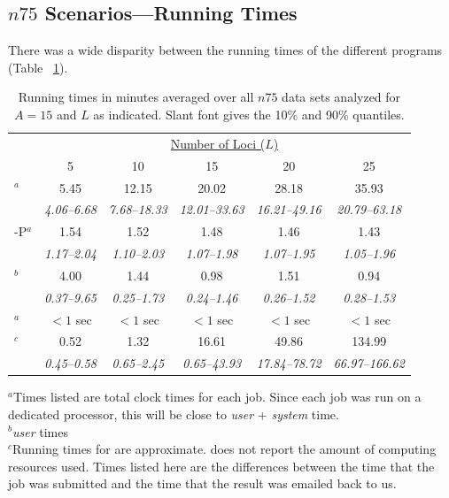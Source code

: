 \subsection*{$n75$ Scenarios---Running Times}
There was a wide disparity between the running times of the different programs (Table~
\ref{tab:n75times}). 
\begin{table}
\caption{Running times in minutes averaged over all $n75$ data sets analyzed for $A=15$ and 
$L$ as indicated. Slant font gives the 10\% and 90\% quantiles.\label{tab:n75times}}
\begin{center}
\begin{tabular}{lccccc}
\hline
  & \multicolumn{5}{c}{\underline{Number of Loci ($L$)}} \\
        & 5  &  10  &  15  &  20  &  25 \\ \hline
\colony{}$^a$  &  5.45  &  12.15  &  20.02  &  28.18  &  35.93 \\
           &  {\sl 4.06--6.68}  &  {\sl 7.68--18.33}  &  {\sl 12.01--33.63}  &  {\sl 16.21--49.16}  &  {\sl 20.79--63.18} \\
\colony{}-P$^a$  &  1.54  &  1.52  &  1.48  &  1.46  &  1.43 \\
           &  {\sl 1.17--2.04}  &  {\sl 1.10--2.03}  &  {\sl 1.07--1.98}  &  {\sl 1.07--1.95}  &  {\sl 1.05--1.96} \\
\prt{}$^b$  &  4.00  &  1.44  &  0.98  &  1.51  &  0.94 \\
        &  {\sl 0.37--9.65}  &  {\sl 0.25--1.73}  &  {\sl 0.24--1.46}  &  {\sl 0.26--1.52}  &  {\sl 0.28--1.53} \\
\familyfinder{}$^a$  &  $<1$ sec  &  $<1$ sec  &  $<1$ sec  &  $<1$ sec  &  $<1$ sec \\
\kinalyzer{}$^c$  &  0.52  &  1.32  &  16.61  &  49.86  &  134.99 \\
              &  {\sl 0.45--0.58}  &  {\sl 0.65--2.45}  &  {\sl 0.65--43.93}  &  {\sl 17.84--78.72}  &  {\sl 66.97--166.62} \\
\hline
\end{tabular}
\end{center}
{\footnotesize $^a$Times listed are total clock times for each job.  Since each job was run on
a dedicated processor, this will be close to {\em user} + {\em system} time.}\\
{\footnotesize $^b${\em user} times}\\
{\footnotesize $^c$Running times for \kinalyzer{} are approximate. \kinalyzer{} does not report
the amount of computing resources used. Times listed here are the differences between the time
that the job was submitted and the time that the result was emailed back to us. }
\end{table}
